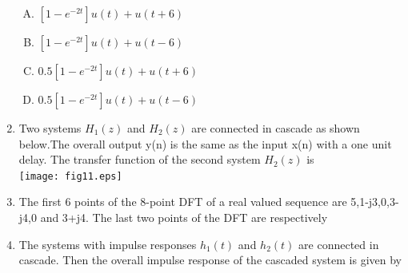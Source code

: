 \documentclass[journal,12pt,twocolumn]{IEEEtran}
\begin{document}
\begin{enumerate}
\begin{enumerate}[(A)]
\item $[1-e^{-2t}]u(t)+u(t+6)$
\item $[1-e^{-2t}]u(t)+u(t-6)$
\item $0.5[1-e^{-2t}]u(t)+u(t+6)$
\item $0.5[1-e^{-2t}]u(t)+u(t-6)$
\end{enumerate}

\item Two systems $H_1(z)$ and $H_2(z)$ are connected in cascade as shown below.The overall output y(n) is the same as the input x(n) with a one unit delay. The transfer function of the second system $H_2(z)$ is\\
\texttt{[image: fig11.eps]}
\begin{enumerate}[(A)]
\end{enumerate}

\item The first 6 points of the 8-point DFT of a real valued sequence are 5,1-j3,0,3-j4,0 and 3+j4. The last two points of the DFT are respectively
\begin{enumerate}[(A)]
\end{enumerate}

\item The systems with impulse responses $h_1(t)$ and $h_2(t)$ are connected in cascade. Then the overall impulse response of the cascaded system is given by
\begin{enumerate}[(A)]
\setlength\itemsep{2em}


\end{enumerate}
\end{enumerate}
\end{document}
